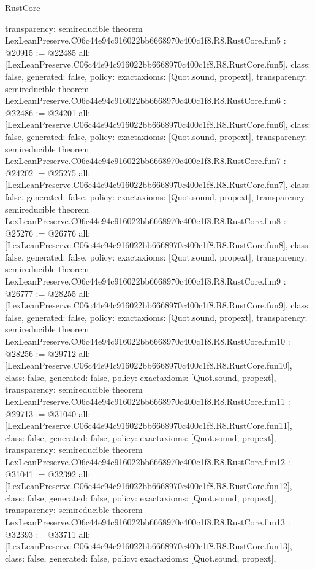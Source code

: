 \begin{lexlean}{RustCore}
\begin{coremodule}
{  transparency: semireducible
}
theorem LexLeanPreserve.C06c44e94c916022bb6668970c400c1f8.R8.RustCore.fun5 : @20915 := @22485 {
  all: [LexLeanPreserve.C06c44e94c916022bb6668970c400c1f8.R8.RustCore.fun5],
  class: false,
  generated: false,
  policy: exact{axioms: [Quot.sound, propext]},
  transparency: semireducible
}
theorem LexLeanPreserve.C06c44e94c916022bb6668970c400c1f8.R8.RustCore.fun6 : @22486 := @24201 {
  all: [LexLeanPreserve.C06c44e94c916022bb6668970c400c1f8.R8.RustCore.fun6],
  class: false,
  generated: false,
  policy: exact{axioms: [Quot.sound, propext]},
  transparency: semireducible
}
theorem LexLeanPreserve.C06c44e94c916022bb6668970c400c1f8.R8.RustCore.fun7 : @24202 := @25275 {
  all: [LexLeanPreserve.C06c44e94c916022bb6668970c400c1f8.R8.RustCore.fun7],
  class: false,
  generated: false,
  policy: exact{axioms: [Quot.sound, propext]},
  transparency: semireducible
}
theorem LexLeanPreserve.C06c44e94c916022bb6668970c400c1f8.R8.RustCore.fun8 : @25276 := @26776 {
  all: [LexLeanPreserve.C06c44e94c916022bb6668970c400c1f8.R8.RustCore.fun8],
  class: false,
  generated: false,
  policy: exact{axioms: [Quot.sound, propext]},
  transparency: semireducible
}
theorem LexLeanPreserve.C06c44e94c916022bb6668970c400c1f8.R8.RustCore.fun9 : @26777 := @28255 {
  all: [LexLeanPreserve.C06c44e94c916022bb6668970c400c1f8.R8.RustCore.fun9],
  class: false,
  generated: false,
  policy: exact{axioms: [Quot.sound, propext]},
  transparency: semireducible
}
theorem LexLeanPreserve.C06c44e94c916022bb6668970c400c1f8.R8.RustCore.fun10 : @28256 := @29712 {
  all: [LexLeanPreserve.C06c44e94c916022bb6668970c400c1f8.R8.RustCore.fun10],
  class: false,
  generated: false,
  policy: exact{axioms: [Quot.sound, propext]},
  transparency: semireducible
}
theorem LexLeanPreserve.C06c44e94c916022bb6668970c400c1f8.R8.RustCore.fun11 : @29713 := @31040 {
  all: [LexLeanPreserve.C06c44e94c916022bb6668970c400c1f8.R8.RustCore.fun11],
  class: false,
  generated: false,
  policy: exact{axioms: [Quot.sound, propext]},
  transparency: semireducible
}
theorem LexLeanPreserve.C06c44e94c916022bb6668970c400c1f8.R8.RustCore.fun12 : @31041 := @32392 {
  all: [LexLeanPreserve.C06c44e94c916022bb6668970c400c1f8.R8.RustCore.fun12],
  class: false,
  generated: false,
  policy: exact{axioms: [Quot.sound, propext]},
  transparency: semireducible
}
theorem LexLeanPreserve.C06c44e94c916022bb6668970c400c1f8.R8.RustCore.fun13 : @32393 := @33711 {
  all: [LexLeanPreserve.C06c44e94c916022bb6668970c400c1f8.R8.RustCore.fun13],
  class: false,
  generated: false,
  policy: exact{axioms: [Quot.sound, propext]},
}
\end{coremodule}
\end{lexlean}
